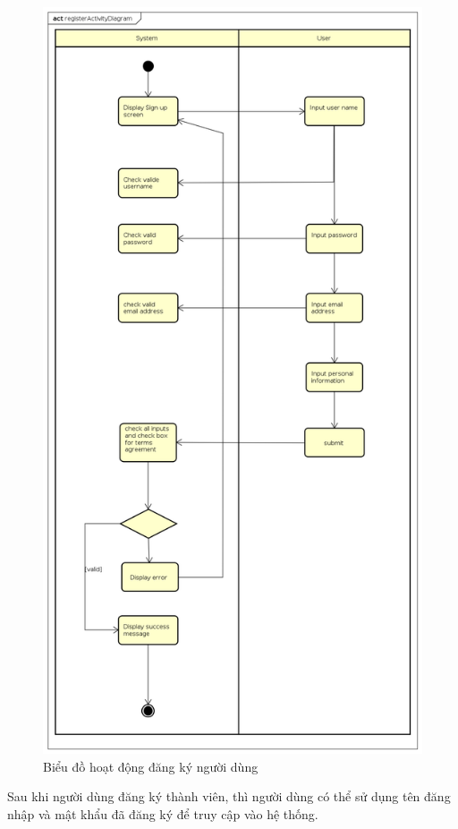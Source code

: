 \documentclass{article}
\begin{document}
\begin{figure}[h]
	\centering
	\includegraphics[scale=0.3]{figures/actreg.png}
	\caption{Biểu đồ hoạt động đăng ký người dùng}
	\label{fig:actreg}
\end{figure}

Sau khi người dùng đăng ký thành viên, thì người dùng có thể sử dụng tên đăng nhập và mật khẩu đã đăng ký để truy cập vào hệ thống. 
\end{document}
